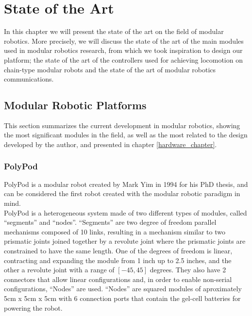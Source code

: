 \chapter{State of the Art}
\label{state_of_the_art}

In this chapter we will present the state of the art on the field of modular robotics. More precisely, we will discuss the state of the art of the main modules used in modular robotics research, from which we took inspiration to design our platform; the state of the art of the controllers used for achieving locomotion on chain-type modular robots and the state of the art of modular robotics communications.\\


\section{Modular Robotic Platforms}
\label{state_art_modules}
This section summarizes the current development in modular robotics, showing the most significant modules in the field, as well as the most related to the design developed by the author, and presented in chapter \ref{hardware_chapter}.

\subsection{PolyPod}
\label{state_modules_PolyPod}

PolyPod \cite{Yim1994, Yim1993} is a modular robot created by Mark Yim in 1994 for his PhD thesis, and can be considered the first robot created with the modular robotic paradigm in mind.\\

PolyPod is a heterogeneous system made of two different types of modules, called ``segments'' and ``nodes''. ``Segments'' are two degree of freedom parallel mechanisms composed of 10 links, resulting in a mechanism similar to two prismatic joints joined together by a revolute joint where the prismatic joints are constrained to have the same length. One of the degrees of freedom is linear, contracting and expanding the module from 1 inch up to 2.5 inches, and the other a revolute joint with a range of $[-45, 45]$ degrees. They also have 2 connectors that allow linear configurations and, in order to enable non-serial configurations, ``Nodes'' are used. ``Nodes'' are squared modules of aproximately 5cm x 5cm x 5cm with 6 connection ports that contain the gel-cell batteries for powering the robot.\\

